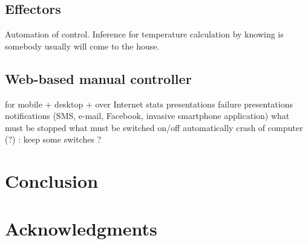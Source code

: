 \documentclass{acm_proc_article-sp}
\begin{document}
\subsection{Effectors}
Automation of control. Inference for temperature calculation by knowing is somebody usually will come to the house.
\subsection{Web-based manual controller}
for mobile + desktop + over Internet
stats presentations
failure presentations
notifications (SMS, e-mail, Facebook, invasive smartphone application)
	what must be stopped
	what must be switched on/off automatically
	crash of computer (?) : keep some switches ?
\section{Conclusion}
\section{Acknowledgments}



%
\end{document}
